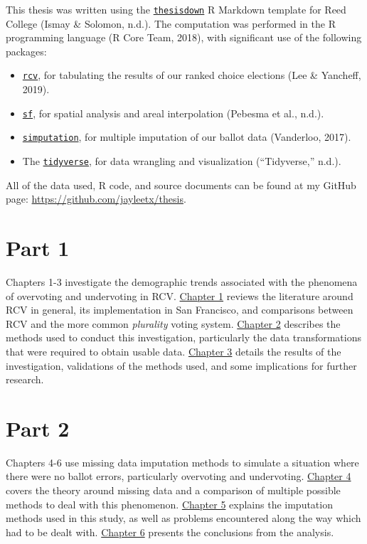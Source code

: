 \documentclass[12pt,twoside]{reedthesis}
\begin{document}
This thesis was written using the \href{https://github.com/ismayc/thesisdown}{\texttt{thesisdown}} R Markdown template for Reed College (Ismay \& Solomon, n.d.). The computation was performed in the R programming language (R Core Team, 2018), with significant use of the following packages:
\begin{itemize}
\item
  \href{https://github.com/ds-elections/rcv}{\texttt{rcv}}, for tabulating the results of our ranked choice elections (Lee \& Yancheff, 2019).
\item
  \href{https://github.com/r-spatial/sf}{\texttt{sf}}, for spatial analysis and areal interpolation (Pebesma et al., n.d.).
\item
  \href{https://github.com/markvanderloo/simputation}{\texttt{simputation}}, for multiple imputation of our ballot data (Vanderloo, 2017).
\item
  The \href{https://www.tidyverse.org/}{\texttt{tidyverse}}, for data wrangling and visualization (``Tidyverse,'' n.d.).
\end{itemize}
All of the data used, R code, and source documents can be found at my GitHub page: \url{https://github.com/jayleetx/thesis}.

\hypertarget{part-1}{%
\section*{Part 1}\label{part-1}}

Chapters 1-3 investigate the demographic trends associated with the phenomena of overvoting and undervoting in RCV.
\protect\hyperlink{demo-litreview}{Chapter 1} reviews the literature around RCV in general, its implementation in San Francisco, and comparisons between RCV and the more common \emph{plurality} voting system.
\protect\hyperlink{demo-methods}{Chapter 2} describes the methods used to conduct this investigation, particularly the data transformations that were required to obtain usable data.
\protect\hyperlink{demo-results}{Chapter 3} details the results of the investigation, validations of the methods used, and some implications for further research.

\hypertarget{part-2}{%
\section*{Part 2}\label{part-2}}

Chapters 4-6 use missing data imputation methods to simulate a situation where there were no ballot errors, particularly overvoting and undervoting.
\protect\hyperlink{missing-litreview}{Chapter 4} covers the theory around missing data and a comparison of multiple possible methods to deal with this phenomenon.
\protect\hyperlink{missing-methods}{Chapter 5} explains the imputation methods used in this study, as well as problems encountered along the way which had to be dealt with.
\protect\hyperlink{missing-results}{Chapter 6} presents the conclusions from the analysis.
\end{document}
